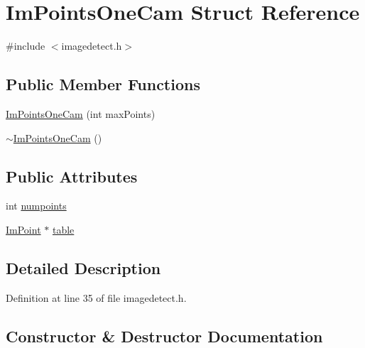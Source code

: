 \hypertarget{struct_im_points_one_cam}{}\section{Im\+Points\+One\+Cam Struct Reference}
\label{struct_im_points_one_cam}


{\ttfamily \#include $<$imagedetect.\+h$>$}

\subsection*{Public Member Functions}
\begin{DoxyCompactItemize}
\item 
\mbox{\hyperlink{struct_im_points_one_cam_afc1b3b5d5dec2b62e3de68d423252050}{Im\+Points\+One\+Cam}} (int max\+Points)
\item 
\mbox{\hyperlink{struct_im_points_one_cam_a7f07e22513b0c58cd4c57bae9b7c5db2}{$\sim$\+Im\+Points\+One\+Cam}} ()
\end{DoxyCompactItemize}
\subsection*{Public Attributes}
\begin{DoxyCompactItemize}
\item 
int \mbox{\hyperlink{struct_im_points_one_cam_af97c7038c28495424c5d7d982406a243}{numpoints}}
\item 
\mbox{\hyperlink{struct_im_point}{Im\+Point}} $\ast$ \mbox{\hyperlink{struct_im_points_one_cam_aabcd72a8bb4430c36d3c55116a7b87b5}{table}}
\end{DoxyCompactItemize}


\subsection{Detailed Description}


Definition at line 35 of file imagedetect.\+h.



\subsection{Constructor \& Destructor Documentation}
\mbox{\label{struct_im_points_one_cam_afc1b3b5d5dec2b62e3de68d423252050}} 
